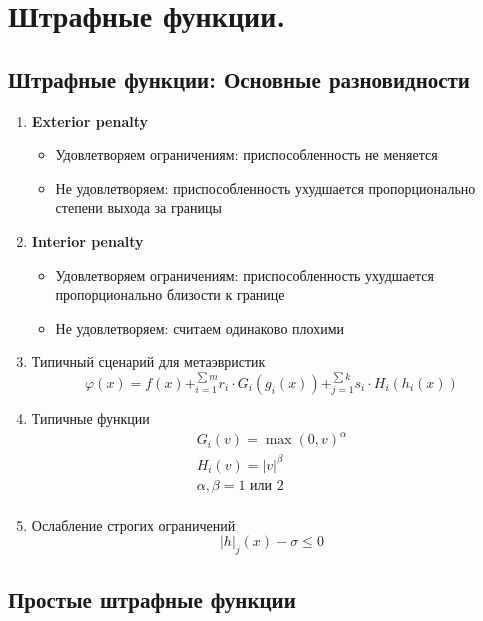 \usepackage{amsmath}
\usepackage{lh}


\section{Штрафные функции.}

\subsection{Штрафные функции: Основные разновидности}
\begin{enumerate}
    \item \textbf{Exterior penalty}
    \begin{itemize}
        \item Удовлетворяем ограничениям: приспособленность не меняется
        \item Не удовлетворяем: приспособленность ухудшается пропорционально степени выхода за границы
    \end{itemize}


    \item \textbf{Interior penalty}
    \begin{itemize}
        \item  Удовлетворяем ограничениям: приспособленность ухудшается пропорционально близости к границе
        \item  Не удовлетворяем: считаем одинаково плохими
    \end{itemize}

    \item Типичный сценарий для метаэвристик \[\varphi(x) = f(x) + ^{\sum m} _{i=1} r_{i} \cdot G_{i}(g_{i}(x)) + ^{\sum k} _{j=1} s_{i} \cdot H_{i}(h_{i}(x))\]
    \item Типичные функции \begin{gather*}
                               G_{i}(v) = \max(0, v)^{\alpha}\\
                               H_{i}(v) = |v|^{\beta}\\
                               \alpha, \beta = 1 \text{ или } 2\\
    \end{gather*}
    \item Ослабление строгих ограничений \[|h|_{j}(x) - \sigma \leq 0\]
\end{enumerate}


\subsection{Простые штрафные функции}

